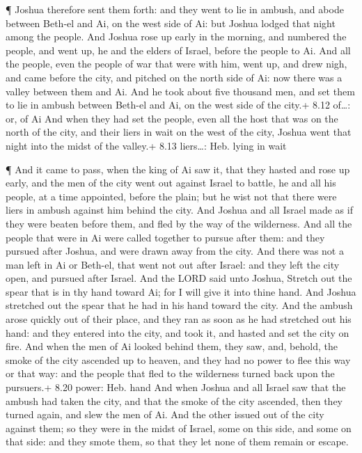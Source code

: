  ¶ Joshua therefore sent them forth: and they went to lie in
ambush, and abode between Beth-el and Ai, on the west side of Ai: but
Joshua lodged that night among the people.  And Joshua rose
up early in the morning, and numbered the people, and went up, he and
the elders of Israel, before the people to Ai.  And all the
people, even the people of war that were with him, went up, and drew
nigh, and came before the city, and pitched on the north side of Ai: now
there was a valley between them and Ai.  And he took about
five thousand men, and set them to lie in ambush between Beth-el and Ai,
on the west side of the city.+ 8.12 of\ldots: or, of Ai 
And when they had set the people, even all the host that was on the
north of the city, and their liers in wait on the west of the city,
Joshua went that night into the midst of the valley.+ 8.13 liers\ldots:
Heb. lying in wait

 ¶ And it came to pass, when the king of Ai saw it, that
they hasted and rose up early, and the men of the city went out against
Israel to battle, he and all his people, at a time appointed, before the
plain; but he wist not that there were liers in ambush against him
behind the city.  And Joshua and all Israel made as if they
were beaten before them, and fled by the way of the wilderness.
 And all the people that were in Ai were called together to
pursue after them: and they pursued after Joshua, and were drawn away
from the city.  And there was not a man left in Ai or
Beth-el, that went not out after Israel: and they left the city open,
and pursued after Israel.  And the LORD said unto Joshua,
Stretch out the spear that is in thy hand toward Ai; for I will give it
into thine hand. And Joshua stretched out the spear that he had in his
hand toward the city.  And the ambush arose quickly out of
their place, and they ran as soon as he had stretched out his hand: and
they entered into the city, and took it, and hasted and set the city on
fire.  And when the men of Ai looked behind them, they saw,
and, behold, the smoke of the city ascended up to heaven, and they had
no power to flee this way or that way: and the people that fled to the
wilderness turned back upon the pursuers.+ 8.20 power: Heb. hand
 And when Joshua and all Israel saw that the ambush had
taken the city, and that the smoke of the city ascended, then they
turned again, and slew the men of Ai.  And the other issued
out of the city against them; so they were in the midst of Israel, some
on this side, and some on that side: and they smote them, so that they
let none of them remain or escape.

